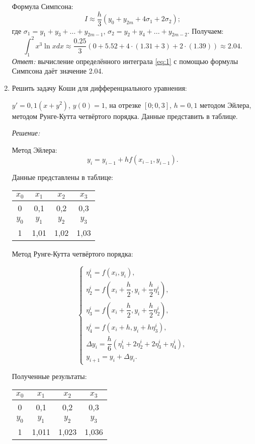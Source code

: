 \documentclass[a4paper, 12pt]{article}
\begin{document}
\begin{enumerate}
{    Формула Симпсона:
    $$I \approx \dfrac {h} {3} \left ( y_0 + y_{2m} + 4 \sigma_1 + 2 \sigma_2 \right );$$
    где $\sigma_1 = y_1 + y_3 + ... + y_{2m-1}$, $\sigma_2 = y_2 + y_4 + ... + y_{2m-2}$.
    Получаем:
    $$\int_1^2x^3 \ln{x} dx \approx \dfrac {0.25} {3} \left ( 0 + 5.52 + 4 \cdot (1.31 + 3) + 2 \cdot (1.39) \right ) \approx 2.04.$$
    \emph{Ответ:} вычисление определённого интеграла \eqref{eq:1} с помощью формулы Симпсона даёт значение 2.04.
  }
\item{Решить задачу Коши для дифференциального уравнения:

    $y' = 0,1(x + y^2)$, $y(0) = 1$, на отрезке $[0; 0,3]$, $h=0,1$ методом Эйлера, методом Рунге-Кутта четвёртого порядка. Данные представить в таблице.

    \emph{Решение:}

    Метод Эйлера:
    $$y_i = y_{i-1} + h f(x_{i-1}, y_{i-1}).$$

    Данные представлены в таблице:

    \begin{center}
      \begin{tabular}{|c|c|c|c|}
        \hline
        $x_0$ & $x_1$ & $x_2$ & $x_3$ \\ \hline
        0 & 0,1 & 0,2 & 0,3 \\ \hline
        $y_0$ & $y_1$ & $y_2$ & $y_3$ \\ \hline
        1 & 1,01 & 1,02 & 1,03 \\ \hline
      \end{tabular}
    \end{center}

    Метод Рунге-Кутта четвёртого порядка:

    $$
    \begin{cases}
      \eta_1^i = f(x_i, y_i), \\
      \eta_2^i = f \left ( x_i + \dfrac {h} {2}, y_i + \dfrac {h} {2} \eta_1^i \right ), \\
      \eta_3^i = f \left ( x_i + \dfrac {h} {2}, y_i + \dfrac {h} {2} \eta_2^i \right ), \\
      \eta_4^i = f \left ( x_i + h, y_i + h \eta_3^i \right ), \\
      \Delta y_i = \dfrac {h} {6} \left ( \eta_1^i + 2 \eta_2^i + 2 \eta_3^i + \eta_4^i \right ), \\
      y_{i+1} = y_i + \Delta y_i.
    \end{cases}
    $$

    Полученные результаты:
    \begin{center}
      \begin{tabular}{|c|c|c|c|}
        \hline
        $x_0$ & $x_1$ & $x_2$ & $x_3$ \\ \hline
        0 & 0,1 & 0,2 & 0,3 \\ \hline
        $y_0$ & $y_1$ & $y_2$ & $y_3$ \\ \hline
        1 & 1,011 & 1,023 & 1,036 \\ \hline
      \end{tabular}
    \end{center}

}
\end{enumerate}
\end{document}
